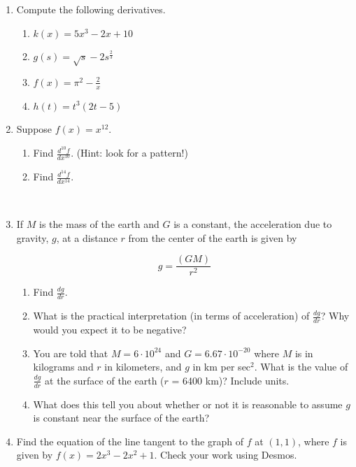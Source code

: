 \documentclass[12pt]{article}
\begin{document}
\begin{enumerate}
\item Compute the following derivatives.
	\begin{enumerate}

	\item $k\left(x\right)=5x^{3}-2x+10$
	\vfill
	\item $g\left(s\right)=\sqrt{s}-2s^{\frac{2}{3}}$
		\vfill
	\item $f(x)=\pi^{2}-\frac{2}{x}$
		\vfill
	\item $h(t)=t^{3}(2t-5)$
		\vfill
	\end{enumerate}

\item Suppose $\displaystyle f\left(x\right)=x^{12}$. 
	\begin{enumerate}
	\item Find $\displaystyle\frac{d^{10}f}{dx^{10}}$. (Hint: look for a pattern!)
	\vfill
	\item Find $\displaystyle\frac{d^{14}f}{dx^{14}}$.
	\vfill
	\end{enumerate}
\newpage
~
\item If $M$ is the mass of the earth and $G$ is a constant, the acceleration due to gravity, $g$, at a distance $r$ from the center of the earth is given by

$$g=\frac{\left(GM\right)}{r^{2}}$$
	\begin{enumerate}
	\item Find $\displaystyle \frac{dg}{dr}$.
	\vfill
	\item What is the practical interpretation (in terms of acceleration) of $\displaystyle \frac{dg}{dr}$? Why would you expect it to be negative?
	\vfill
	\item You are told that $\displaystyle M=6·10^{24}$ and $\displaystyle G=6.67·10^{-20}$ where $M$ is in kilograms and $r$ in kilometers, and $g$ in km per sec$^{2}$. What is the value of $\displaystyle \frac{dg}{dr}$ at the surface of the earth ($r$ = 6400 km)? Include units.
	\vfill
	\item What does this tell you about whether or not it is reasonable to assume $g$ is constant near the surface of the earth?
		\vfill
 	\end{enumerate}
	
\item Find the equation of the line tangent to the graph of $f$ at $(1,1)$, where $f$ is given by $f(x)=2x^{3}-2x^{2}+1$. Check your work using Desmos.
	\vfill
\end{enumerate}	
\end{document}
